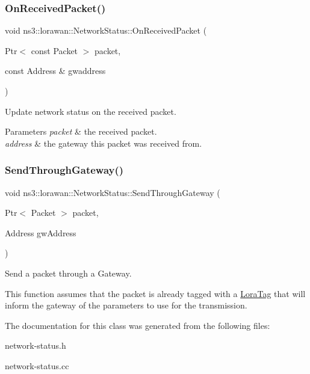 \subsubsection{\texorpdfstring{On\+Received\+Packet()}{OnReceivedPacket()}}
{\footnotesize\ttfamily void ns3\+::lorawan\+::\+Network\+Status\+::\+On\+Received\+Packet (\begin{DoxyParamCaption}\item[{Ptr$<$ const Packet $>$}]{packet,  }\item[{const Address \&}]{gwaddress }\end{DoxyParamCaption})}

Update network status on the received packet.


\begin{DoxyParams}{Parameters}
{\em packet} & the received packet. \\
\hline
{\em address} & the gateway this packet was received from. \\
\hline
\end{DoxyParams}
\mbox{\label{classns3_1_1lorawan_1_1NetworkStatus_a7b7b94a295a6306a6babcc97cd2f5491}} 
\subsubsection{\texorpdfstring{Send\+Through\+Gateway()}{SendThroughGateway()}}
{\footnotesize\ttfamily void ns3\+::lorawan\+::\+Network\+Status\+::\+Send\+Through\+Gateway (\begin{DoxyParamCaption}\item[{Ptr$<$ Packet $>$}]{packet,  }\item[{Address}]{gw\+Address }\end{DoxyParamCaption})}

Send a packet through a Gateway.

This function assumes that the packet is already tagged with a \hyperlink{classns3_1_1lorawan_1_1LoraTag}{Lora\+Tag} that will inform the gateway of the parameters to use for the transmission. 

The documentation for this class was generated from the following files\+:\begin{DoxyCompactItemize}
\item 
network-\/status.\+h\item 
network-\/status.\+cc\end{DoxyCompactItemize}
